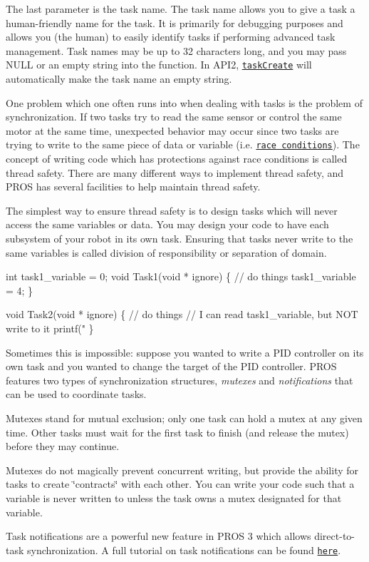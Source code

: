 The last parameter is the task name. The task name allows you to give a task a human-\/friendly name for the task. It is primarily for debugging purposes and allows you (the human) to easily identify tasks if performing advanced task management. Task names may be up to 32 characters long, and you may pass N\+U\+LL or an empty string into the function. In A\+P\+I2, \href{../../../cortex/api/index.html#taskCreate}{\tt task\+Create} will automatically make the task name an empty string.

One problem which one often runs into when dealing with tasks is the problem of synchronization. If two tasks try to read the same sensor or control the same motor at the same time, unexpected behavior may occur since two tasks are trying to write to the same piece of data or variable (i.\+e. \href{https://en.wikipedia.org/wiki/Race_condition#Software}{\tt race conditions}). The concept of writing code which has protections against race conditions is called thread safety. There are many different ways to implement thread safety, and P\+R\+OS has several facilities to help maintain thread safety.

The simplest way to ensure thread safety is to design tasks which will never access the same variables or data. You may design your code to have each subsystem of your robot in its own task. Ensuring that tasks never write to the same variables is called division of responsibility or separation of domain.


\begin{DoxyCode}
int task1\_variable = 0;
void Task1(void * ignore) \{
    // do things
    task1\_variable = 4;
\}

void Task2(void * ignore) \{
  // do things
  // I can read task1\_variable, but NOT write to it
  printf("%
\}
\end{DoxyCode}


Sometimes this is impossible\+: suppose you wanted to write a P\+ID controller on its own task and you wanted to change the target of the P\+ID controller. P\+R\+OS features two types of synchronization structures, {\itshape mutexes} and {\itshape notifications} that can be used to coordinate tasks.

Mutexes stand for mutual exclusion; only one task can hold a mutex at any given time. Other tasks must wait for the first task to finish (and release the mutex) before they may continue.

Mutexes do not magically prevent concurrent writing, but provide the ability for tasks to create \char`\"{}contracts\char`\"{} with each other. You can write your code such that a variable is never written to unless the task owns a mutex designated for that variable.

Task notifications are a powerful new feature in P\+R\+OS 3 which allows direct-\/to-\/task synchronization. A full tutorial on task notifications can be found \href{./notifications.html}{\tt here}. 